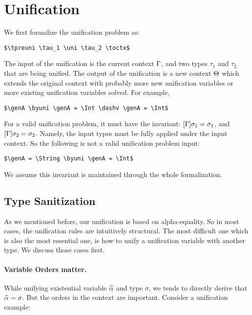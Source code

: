 \section{Unification}
\label{sec:unification}

We first formalize the unification problem as:

\begin{lstlisting}
$\tpreuni \tau_1 \uni \tau_2 \toctx$
\end{lstlisting}

The input of the unification is the current context $\Gamma$, and two types
$\tau_1$ and $\tau_2$ that are being unified. The output of the unification
is a new context $\Theta$ which extends the original context with probably more
new unification variables or more existing
unification variables solved. For example,

\begin{lstlisting}
$\genA \byuni \genA = \Int \dashv \genA = \Int$
\end{lstlisting}

For a valid unification problem, it must have the invariant: $[\Gamma] \sigma_1 =
\sigma_1$, and $[\Gamma] \sigma_2 = \sigma_2$. Namely, the input types must be
fully applied under the input context. So the following is not a valid
unification problem input:

\begin{lstlisting}
$\genA = \String \byuni \genA = \Int$
\end{lstlisting}

We assume this invariant is maintained through the whole
formalization.

\subsection{Type Sanitization}

As we mentioned before, our unification is based on alpha-equality. So in most
cases, the unification rules are intuitively structural. The most difficult
one which is also the most essential one, is how to unify a unification variable
with another type. We discuss those cases first.

\paragraph{Variable Orders matter.}

While unifying existential variable $\widehat{\alpha}$ and type $\sigma$, we tends to
directly derive that $\widehat{\alpha} = \sigma$. But the orders in the context are
important. Consider a unification example:

